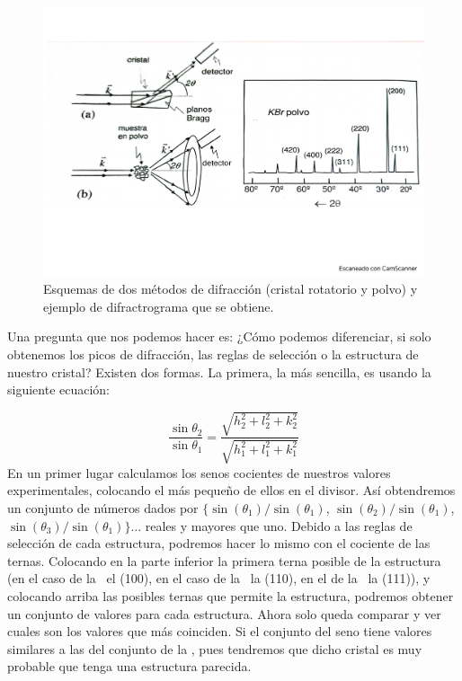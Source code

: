    
\begin{figure}[h!] \centering
    \includegraphics[scale=0.35]{Cuerpo/Ch_02/Fotos_libro 8.pdf}
    \caption{Esquemas de dos métodos de difracción (cristal rotatorio y polvo) y ejemplo de difractrograma que se obtiene.}
    \label{Fig:02-08}
\end{figure}

Una pregunta que nos podemos hacer es: ¿Cómo podemos diferenciar, si solo obtenemos los picos de difracción, las reglas de selección o la estructura de nuestro cristal? Existen dos formas. La primera, la más sencilla, es usando la siguiente ecuación:

\begin{equation}
    \frac{\sin \theta_2}{\sin \theta_1} = \frac{\sqrt{h_2^2+l_2^2+k_2^2}}{\sqrt{h_1^2+l_1^2+k_1^2}}
\end{equation}
En un primer lugar calculamos los senos cocientes de nuestros valores experimentales, colocando el más pequeño de ellos en el divisor. Así obtendremos un conjunto de números dados por $\{ \sin(\theta_1)/\sin(\theta_1)$, $\sin(\theta_2)/\sin(\theta_1)$, $\sin(\theta_3)/\sin(\theta_1) \}$... reales y mayores que uno. Debido a las reglas de selección de cada estructura, podremos hacer lo mismo con el cociente de las ternas. Colocando en la parte inferior la primera terna posible de la estructura (en el caso de la \sc \ el (100), en el caso de la \bcc \ la (110), en el de la \fcc \ la (111)), y colocando arriba las posibles ternas que permite la estructura, podremos obtener un conjunto de valores para cada estructura. Ahora solo queda comparar y ver cuales son los valores que más coinciden. Si el conjunto del seno tiene valores similares a las del conjunto de la \fcc, pues tendremos que dicho cristal es muy probable que tenga una estructura parecida. 

